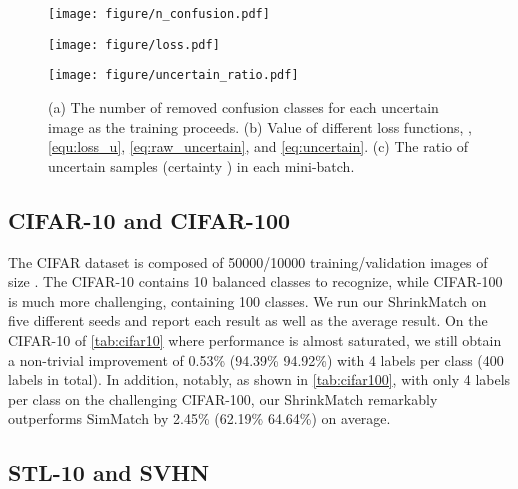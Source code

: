 \documentclass[10pt,twocolumn,letterpaper]{article}
\begin{document}
\begin{figure*}[t]
\centering
    \begin{minipage}{0.31\linewidth}
    \centering\captionsetup[subfigure]{justification=centering}
    \texttt{[image: figure/n\_confusion.pdf]}
    \label{fig:n_confusion}
    \end{minipage}
    \hspace{2mm}
    \begin{minipage}{0.31\linewidth}
    \texttt{[image: figure/loss.pdf]}
    \label{fig:loss}
    \end{minipage}
    \hspace{2mm}
    \begin{minipage}{0.31\linewidth}
    \texttt{[image: figure/uncertain\_ratio.pdf]}
    \label{fig:proportion}
    \end{minipage}
    \vspace{-2mm}
\caption{(a) The number of removed confusion classes for each uncertain image as the training proceeds. (b) Value of different loss functions, \ie, \cref{equ:loss_u}, \cref{eq:raw_uncertain}, and \cref{eq:uncertain}. (c) The ratio of uncertain samples (certainty ) in each mini-batch.}
\vspace{-2mm}
\end{figure*}


\subsection{CIFAR-10 and CIFAR-100}

The CIFAR dataset is composed of 50000/10000 training/validation images of size . The CIFAR-10 contains 10 balanced classes to recognize, while CIFAR-100 is much more challenging, containing 100 classes. We run our ShrinkMatch on five different seeds and report each result as well as the average result. On the CIFAR-10 of \cref{tab:cifar10} where performance is almost saturated, we still obtain a non-trivial improvement of 0.53\% (94.39\%  94.92\%) with 4 labels per class (400 labels in total). In addition, notably, as shown in \cref{tab:cifar100}, with only 4 labels per class on the challenging CIFAR-100, our ShrinkMatch remarkably outperforms SimMatch by 2.45\% (62.19\%  64.64\%) on average.

\subsection{STL-10 and SVHN}
\end{document}
